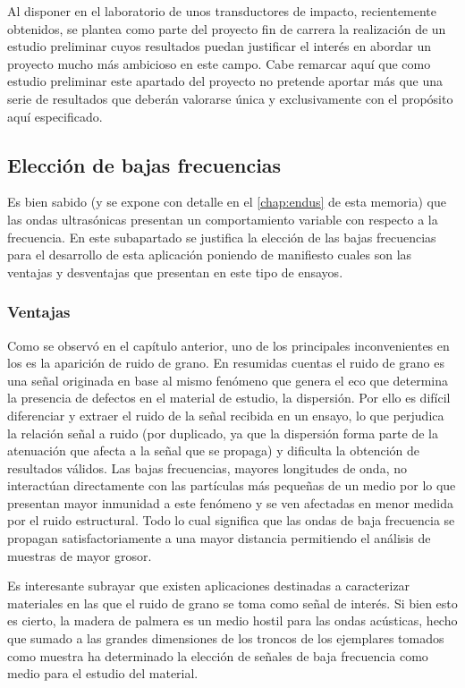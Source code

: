 Al disponer en el laboratorio de unos transductores de impacto,
recientemente obtenidos, se plantea como parte del proyecto fin de carrera
la realización de un estudio preliminar cuyos resultados puedan justificar
el interés en abordar un proyecto mucho más ambicioso en este campo. Cabe
remarcar aquí que como estudio preliminar este apartado del proyecto no
pretende aportar más que una serie de resultados que deberán valorarse
única y exclusivamente con el propósito aquí especificado.


\subsection{Elección de bajas frecuencias}

Es bien sabido (y se expone con detalle en el \vref{chap:endus} de esta
memoria) que las ondas ultrasónicas presentan un comportamiento variable
con respecto a la frecuencia. En este subapartado se justifica la elección
de las bajas frecuencias para el desarrollo de esta aplicación poniendo de
manifiesto cuales son las ventajas y desventajas que presentan en este tipo
de ensayos.


\subsubsection{Ventajas}

Como se observó en el capítulo anterior, uno de los principales
inconvenientes en los  es la aparición de ruido de grano. En
resumidas cuentas el ruido de grano es una señal originada en base al mismo
fenómeno que genera el eco que determina la presencia de defectos en el
material de estudio, la dispersión. Por ello es difícil diferenciar y
extraer el ruido de la señal recibida en un ensayo, lo que perjudica la
relación señal a ruido (por duplicado, ya que la dispersión forma parte de
la atenuación que afecta a la señal que se propaga) y dificulta la
obtención de resultados válidos. Las bajas frecuencias, mayores longitudes
de onda, no interactúan directamente con las partículas más pequeñas de un
medio por lo que presentan mayor inmunidad a este fenómeno y se ven
afectadas en menor medida por el ruido estructural. Todo lo cual significa
que las ondas de baja frecuencia se propagan satisfactoriamente a una mayor
distancia permitiendo el análisis de muestras de mayor grosor.

Es interesante subrayar que existen aplicaciones destinadas a caracterizar
materiales en las que el ruido de grano se toma como señal de interés. Si
bien esto es cierto, la madera de palmera es un medio hostil para las ondas
acústicas, hecho que sumado a las grandes dimensiones de los troncos de los
ejemplares tomados como muestra ha determinado la elección de señales de
baja frecuencia como medio para el estudio del material.


